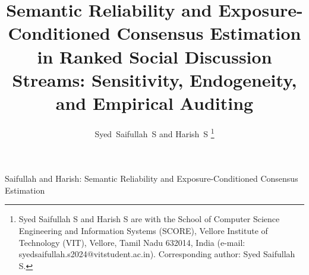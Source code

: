 \documentclass[journal]{IEEEtran}
\begin{document}
\title{Semantic Reliability and Exposure-Conditioned Consensus Estimation in Ranked Social Discussion Streams: Sensitivity, Endogeneity, and Empirical Auditing}

\author{Syed~Saifullah~S and Harish~S%
\thanks{Syed Saifullah S and Harish S are with the School of Computer Science Engineering and Information Systems (SCORE), Vellore Institute of Technology (VIT), Vellore, Tamil Nadu 632014, India (e-mail: syedsaifullah.s2024@vitstudent.ac.in). Corresponding author: Syed Saifullah S.}}

%
{Saifullah and Harish: Semantic Reliability and Exposure-Conditioned Consensus Estimation}

\maketitle
\end{document}
